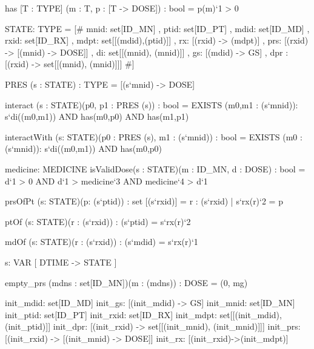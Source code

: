\begin{pvs}
  has [T : TYPE] (m : T, p : [T -> DOSE]) : bool = p(m)`1 > 0

  STATE: TYPE =
    [#
        mnid: set[ID_MN]  %
      ,	ptid: set[ID_PT]  %
      , mdid: set[ID_MD]  %
      ,	rxid: set[ID_RX]  %
      , mdpt: set[[(mdid),(ptid)]] 
      , rx:   [(rxid) -> (mdpt)]   
      , prs: [(rxid) -> [(mnid) -> DOSE]] 
      , di: set[[(mnid), (mnid)]]  
      , gs: [(mdid) -> GS] %
      , dpr : [(rxid) -> set[[(mnid), (mnid)]]]
   #]

  PRES (s : STATE) : TYPE =  [(s`mnid) -> DOSE]

  interact (s : STATE)(p0, p1 : PRES (s)) : bool =
  	   EXISTS (m0,m1 : (s`mnid)):
	   	  s`di((m0,m1))
	      AND has(m0,p0)
	      AND has(m1,p1)

  interactWith (s: STATE)(p0 : PRES (s), m1 : (s`mnid)) : bool =
  	   EXISTS (m0 : (s`mnid)): s`di((m0,m1)) AND has(m0,p0)

	   medicine: MEDICINE
  isValidDose(s : STATE)(m : ID_MN, d : DOSE) : 
  bool = d`1 > 0 AND d`1 > medicine`3 AND medicine`4 > d`1

  prsOfPt (s: STATE)(p: (s`ptid)) : set [(s`rxid)] =
  	  { r : (s`rxid) | s`rx(r)`2 = p }

  ptOf (s: STATE)(r : (s`rxid)) : (s`ptid) = s`rx(r)`2

  mdOf (s: STATE)(r : (s`rxid)) : (s`mdid) = s`rx(r)`1

  s: VAR [ DTIME -> STATE ]

  empty_prs (mdns : set[ID_MN])(m : (mdns)) : DOSE = (0, mg)

  init_mdid: set[ID_MD]
  init_gs: [(init_mdid) -> GS]
  init_mnid: set[ID_MN]
  init_ptid: set[ID_PT]
  init_rxid: set[ID_RX]
  init_mdpt: set[[(init_mdid),(init_ptid)]]
  init_dpr: [(init_rxid) -> set[[(init_mnid), (init_mnid)]]]
  init_prs: [(init_rxid) -> [(init_mnid) -> DOSE]] 
  init_rx: [(init_rxid)->(init_mdpt)]  


\end{pvs}
